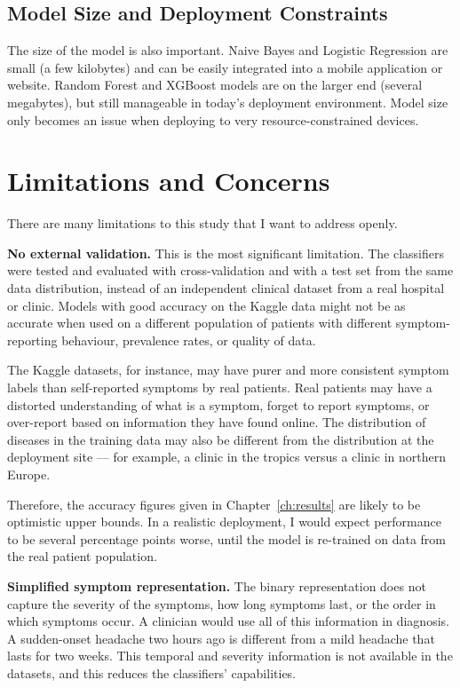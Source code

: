 \subsection{Model Size and Deployment Constraints}

The size of the model is also important. Naive Bayes and Logistic Regression are small (a few kilobytes) and can be easily integrated into a mobile application or website. Random Forest and XGBoost models are on the larger end (several megabytes), but still manageable in today's deployment environment. Model size only becomes an issue when deploying to very resource-constrained devices.

\section{Limitations and Concerns}
\label{sec:limitations}

There are many limitations to this study that I want to address openly.

\textbf{No external validation.} This is the most significant limitation. The classifiers were tested and evaluated with cross-validation and with a test set from the same data distribution, instead of an independent clinical dataset from a real hospital or clinic. Models with good accuracy on the Kaggle data might not be as accurate when used on a different population of patients with different symptom-reporting behaviour, prevalence rates, or quality of data.

The Kaggle datasets, for instance, may have purer and more consistent symptom labels than self-reported symptoms by real patients. Real patients may have a distorted understanding of what is a symptom, forget to report symptoms, or over-report based on information they have found online. The distribution of diseases in the training data may also be different from the distribution at the deployment site --- for example, a clinic in the tropics versus a clinic in northern Europe.

Therefore, the accuracy figures given in Chapter~\ref{ch:results} are likely to be optimistic upper bounds. In a realistic deployment, I would expect performance to be several percentage points worse, until the model is re-trained on data from the real patient population.

\textbf{Simplified symptom representation.} The binary representation does not capture the severity of the symptoms, how long symptoms last, or the order in which symptoms occur. A clinician would use all of this information in diagnosis. A sudden-onset headache two hours ago is different from a mild headache that lasts for two weeks. This temporal and severity information is not available in the datasets, and this reduces the classifiers' capabilities.

